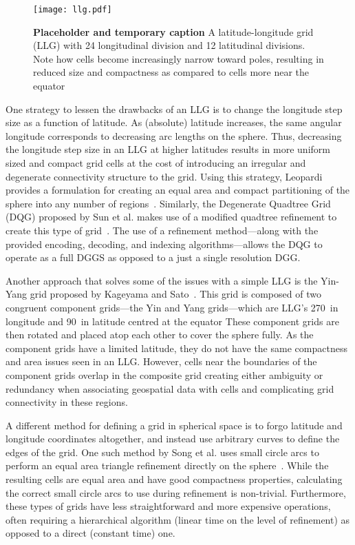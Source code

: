 \begin{figure}[h]
	\centering
	\texttt{[image: llg.pdf]}
	\caption[A Latitude Longitude Grid]{
		\textbf{Placeholder and temporary caption} A latitude-longitude grid (LLG) with 24 longitudinal division and 12 latitudinal divisions.
		Note how cells become increasingly narrow toward poles, resulting in reduced size and compactness as compared to cells more near the equator
	}
	\label{fig:llg}
\end{figure}


One strategy to lessen the drawbacks of an LLG is to change the longitude step size as a function of latitude. As (absolute) latitude increases, the same angular longitude corresponds to decreasing arc lengths on the sphere.
Thus, decreasing the longitude step size in an LLG at higher latitudes results in more uniform sized and compact grid cells at the cost of introducing an irregular and degenerate connectivity structure to the grid.
Using this strategy, Leopardi provides a formulation for creating an equal area and compact partitioning of the sphere into any number of regions~\cite{leopardi2006partition}.
Similarly, the Degenerate Quadtree Grid (DQG) proposed by Sun et al. makes use of a modified quadtree refinement to create this type of grid~\cite{sun2008global}.
The use of a refinement method---along with the provided encoding, decoding, and indexing algorithms---allows the DQG to operate as a full DGGS as opposed to a just a single resolution DGG.


Another approach that solves some of the issues with a simple LLG is the Yin-Yang grid proposed by Kageyama and Sato~\cite{kageyama2004yin-yang}.
This grid is composed of two congruent component grids---the Yin and Yang grids---which are LLG's 270\textdegree \ in longitude and 90\textdegree \ in latitude centred at the equator
These component grids are then rotated and placed atop each other to cover the sphere fully.
As the component grids have a limited latitude, they do not have the same compactness and area issues seen in an LLG.
However, cells near the boundaries of the component grids overlap in the composite grid creating either ambiguity or redundancy when associating geospatial data with cells and complicating grid connectivity in these regions.


A different method for defining a grid in spherical space is to forgo latitude and longitude coordinates altogether, and instead use arbitrary curves to define the edges of the grid.
One such method by Song et al. uses small circle arcs to perform an equal area triangle refinement directly on the sphere~\cite{song2002developing}.
While the resulting cells are equal area and have good compactness properties, calculating the correct small circle arcs to use during refinement is non-trivial.
Furthermore, these types of grids have less straightforward and more expensive operations, often requiring a hierarchical algorithm (linear time on the level of refinement) as opposed to a direct (constant time) one.


